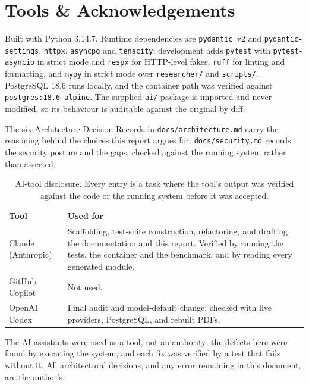 \documentclass[10pt,a4paper]{article}
\begin{document}
\section{Tools \& Acknowledgements}

Built with Python 3.14.7. Runtime dependencies are \texttt{pydantic}~v2 and
\texttt{pydantic-settings}, \texttt{httpx}, \texttt{asyncpg} and \texttt{tenacity}; development
adds \texttt{pytest} with \texttt{pytest-asyncio} in strict mode and \texttt{respx} for
HTTP-level fakes, \texttt{ruff} for linting and formatting, and \texttt{mypy} in strict mode
over \texttt{researcher/} and \texttt{scripts/}. PostgreSQL 18.6 runs locally, and the container
path was verified against \texttt{postgres:18.6-alpine}. The supplied \texttt{ai/} package is
imported and never modified, so its behaviour is auditable against the original by diff.

The six Architecture Decision Records in \texttt{docs/architecture.md} carry the reasoning behind
the choices this report argues for. \texttt{docs/security.md} records the security posture and the
gaps, checked against the running system rather than asserted.

\begin{table}[htbp]
\centering
\footnotesize
\caption{AI-tool disclosure. Every entry is a task where the tool's output was verified against
the code or the running system before it was accepted.}
\label{tab:ai}
\begin{tabularx}{\textwidth}{@{}lX@{}}
\toprule
\textbf{Tool} & \textbf{Used for} \\
\midrule
Claude (Anthropic) & Scaffolding, test-suite construction, refactoring, and drafting the
    documentation and this report. Verified by running the tests, the container and the
    benchmark, and by reading every generated module. \\
GitHub Copilot & Not used. \\
OpenAI Codex & Final audit and model-default change; checked with live providers,
    PostgreSQL, and rebuilt PDFs. \\
\bottomrule
\end{tabularx}
\end{table}

The AI assistants were used as a tool, not an authority: the defects here were found by executing
the system, and each fix was verified by a test that fails without it. All architectural
decisions, and any error remaining in this document, are the author's.
\end{document}
